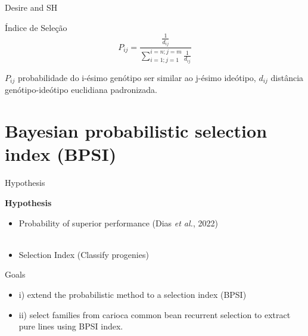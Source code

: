 \documentclass[
  ignorenonframetext,
  aspectratio=169,
]{beamer}
\begin{document}
\begin{frame}{Desire and SH}
\begin{table}
\begin{minipage}{0.25\linewidth}
{}

\end{minipage}%
%
\begin{minipage}{0.25\linewidth}



\end{minipage}%

\end{table}%
\end{frame}

\begin{frame}{Índice de Seleção}
\label{uxedndice-de-seleuxe7uxe3o}
\[
P_{ij} = \frac{\frac{1}{d_{ij}}}{\sum^{i=n;j=m}_{i=1;j=1} \frac{1}{d_{ij}}}
\]

\(P_{ij}\) probabilidade do i-ésimo genótipo ser similar ao j-ésimo
ideótipo, \(d_{ij}\) distância genótipo-ideótipo euclidiana padronizada.
\end{frame}

\section{Bayesian probabilistic selection index
(BPSI)}\label{bayesian-probabilistic-selection-index-bpsi}

\begin{frame}{Hypothesis}
\label{hypothesis}
\begin{block}{\textbf{Hypothesis}}
\begin{itemize}
\item Probability of superior performance (Dias \textit{et al.}, 2022)  \\~\\
\item Selection Index (Classify progenies)
\end{itemize}
\end{block}
\end{frame}

\begin{frame}{Goals}
\label{goals}
\begin{itemize}
\item i) extend the probabilistic method to a selection index (BPSI) 
\item ii) select families from carioca common bean recurrent selection to extract pure lines using BPSI index.
\end{itemize}
\end{frame}
\end{document}
